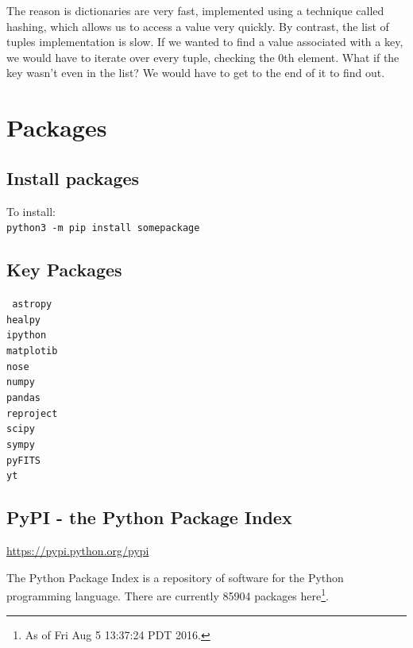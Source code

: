 \documentclass[11pt,a4paper]{article}
\begin{document}
The reason is dictionaries are very fast, implemented using a
technique called hashing, which allows us to access a value very
quickly. By contrast, the list of tuples implementation is slow. If we
wanted to find a value associated with a key, we would have to iterate
over every tuple, checking the 0th element. What if the key wasn’t
even in the list? We would have to get to the end of it to find out.


\newpage
\section{Packages}

\subsection{Install packages}

\noindent
To install: \\
{\tt python3 -m pip install somepackage}


\subsection{Key Packages}
{\tt
astropy \\
healpy\\
ipython \\ 
matplotib\\
nose \\
numpy\\
pandas \\
reproject\\
scipy \\
sympy \\ 
pyFITS\\
yt\\
}


\subsection{PyPI - the Python Package Index}
\noindent
\href{https://pypi.python.org/pypi}{https://pypi.python.org/pypi}

\noindent
The Python Package Index is a repository of software for the Python
programming language. There are currently 85904 packages
here\footnote{As of Fri Aug 5 13:37:24 PDT 2016.}.
\end{document}
